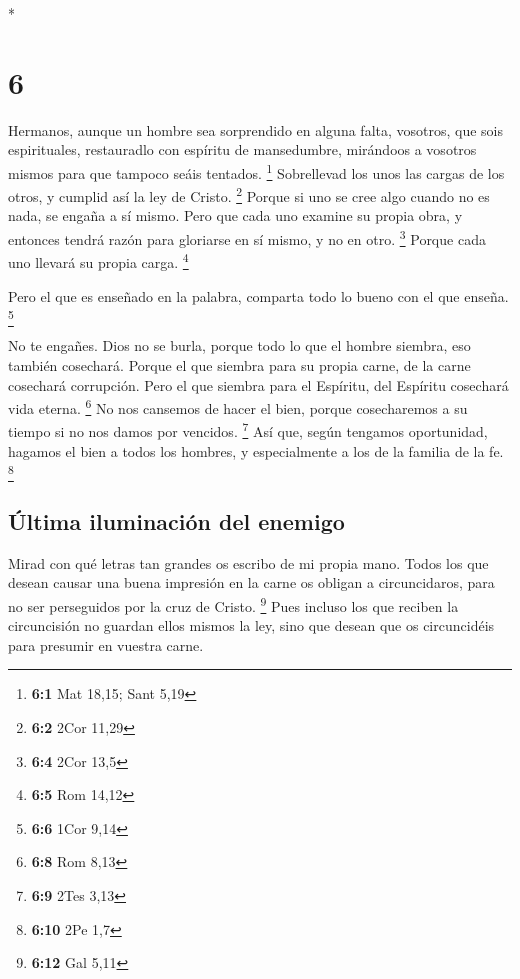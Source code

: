 \begin{paracol}{2}
\begin{otherlanguage}{english}
\end{otherlanguage}

\switchcolumn[0]*

\hypertarget{section-10}{%
\section{6}\label{section-10}}

 Hermanos, aunque un hombre sea sorprendido en alguna
falta, vosotros, que sois espirituales, restauradlo con espíritu de
mansedumbre, mirándoos a vosotros mismos para que tampoco seáis
tentados. \footnote{\textbf{6:1} Mat 18,15; Sant 5,19} 
Sobrellevad los unos las cargas de los otros, y cumplid así la ley de
Cristo. \footnote{\textbf{6:2} 2Cor 11,29}  Porque si uno
se cree algo cuando no es nada, se engaña a sí mismo. 
Pero que cada uno examine su propia obra, y entonces tendrá razón para
gloriarse en sí mismo, y no en otro. \footnote{\textbf{6:4} 2Cor 13,5}
 Porque cada uno llevará su propia carga. \footnote{\textbf{6:5}
  Rom 14,12}

 Pero el que es enseñado en la palabra, comparta todo lo
bueno con el que enseña. \footnote{\textbf{6:6} 1Cor 9,14}

 No te engañes. Dios no se burla, porque todo lo que el
hombre siembra, eso también cosechará.  Porque el que
siembra para su propia carne, de la carne cosechará corrupción. Pero el
que siembra para el Espíritu, del Espíritu cosechará vida eterna.
\footnote{\textbf{6:8} Rom 8,13}  No nos cansemos de hacer
el bien, porque cosecharemos a su tiempo si no nos damos por vencidos.
\footnote{\textbf{6:9} 2Tes 3,13}  Así que, según
tengamos oportunidad, hagamos el bien a todos los hombres, y
especialmente a los de la familia de la fe. \footnote{\textbf{6:10} 2Pe
  1,7}

\hypertarget{uxfaltima-iluminaciuxf3n-del-enemigo}{%
\subsection{Última iluminación del
enemigo}\label{uxfaltima-iluminaciuxf3n-del-enemigo}}

 Mirad con qué letras tan grandes os escribo de mi propia
mano.  Todos los que desean causar una buena impresión en
la carne os obligan a circuncidaros, para no ser perseguidos por la cruz
de Cristo. \footnote{\textbf{6:12} Gal 5,11}  Pues
incluso los que reciben la circuncisión no guardan ellos mismos la ley,
sino que desean que os circuncidéis para presumir en vuestra carne.


\end{paracol}
